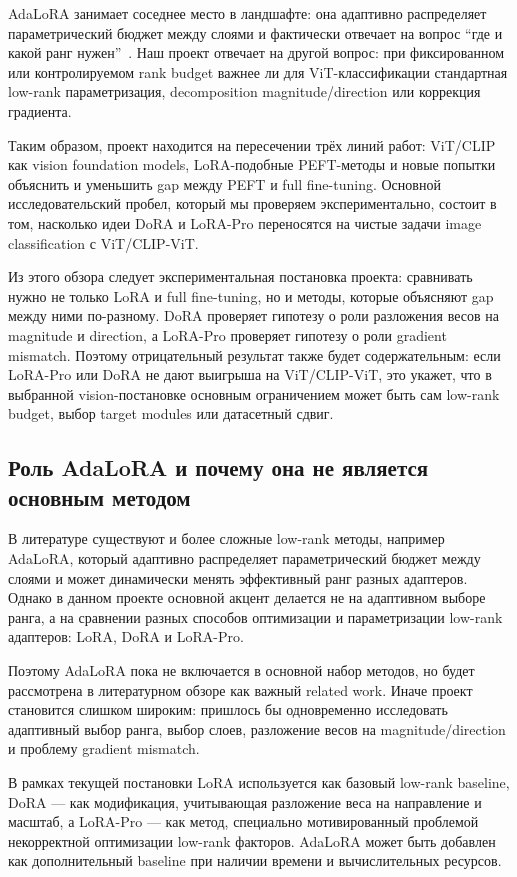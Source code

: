 \documentclass[]{scrartcl}
\begin{document}
AdaLoRA занимает соседнее место в ландшафте: она адаптивно распределяет параметрический бюджет между слоями и фактически отвечает на вопрос ``где и какой ранг нужен''~\cite{zhang2023adalora}. Наш проект отвечает на другой вопрос: при фиксированном или контролируемом rank budget важнее ли для ViT-классификации стандартная low-rank параметризация, decomposition magnitude/direction или коррекция градиента.

Таким образом, проект находится на пересечении трёх линий работ: ViT/CLIP как vision foundation models, LoRA-подобные PEFT-методы и новые попытки объяснить и уменьшить gap между PEFT и full fine-tuning. Основной исследовательский пробел, который мы проверяем экспериментально, состоит в том, насколько идеи DoRA и LoRA-Pro переносятся на чистые задачи image classification с ViT/CLIP-ViT.

Из этого обзора следует экспериментальная постановка проекта: сравнивать нужно не только LoRA и full fine-tuning, но и методы, которые объясняют gap между ними по-разному. DoRA проверяет гипотезу о роли разложения весов на magnitude и direction, а LoRA-Pro проверяет гипотезу о роли gradient mismatch. Поэтому отрицательный результат также будет содержательным: если LoRA-Pro или DoRA не дают выигрыша на ViT/CLIP-ViT, это укажет, что в выбранной vision-постановке основным ограничением может быть сам low-rank budget, выбор target modules или датасетный сдвиг.

\subsection{Роль AdaLoRA и почему она не является основным методом}

В литературе существуют и более сложные low-rank методы, например AdaLoRA,
который адаптивно распределяет параметрический бюджет между слоями и может
динамически менять эффективный ранг разных адаптеров. Однако в данном проекте
основной акцент делается не на адаптивном выборе ранга, а на сравнении разных
способов оптимизации и параметризации low-rank адаптеров: LoRA, DoRA и LoRA-Pro.

Поэтому AdaLoRA пока не включается в основной набор методов, но будет рассмотрена
в литературном обзоре как важный related work. Иначе проект становится слишком
широким: пришлось бы одновременно исследовать адаптивный выбор ранга, выбор
слоев, разложение весов на magnitude/direction и проблему gradient mismatch.

В рамках текущей постановки LoRA используется как базовый low-rank baseline,
DoRA --- как модификация, учитывающая разложение веса на направление и масштаб,
а LoRA-Pro --- как метод, специально мотивированный проблемой некорректной
оптимизации low-rank факторов. AdaLoRA может быть добавлен как дополнительный
baseline при наличии времени и вычислительных ресурсов.
\end{document}
